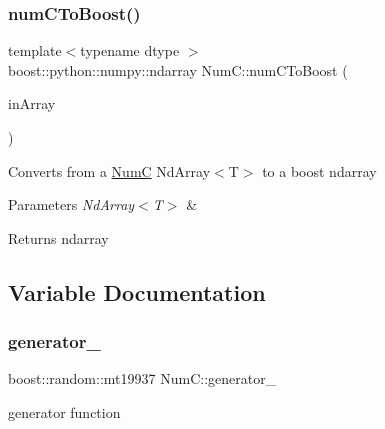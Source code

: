 \subsubsection{\texorpdfstring{num\+C\+To\+Boost()}{numCToBoost()}}
{\footnotesize\ttfamily template$<$typename dtype $>$ \\
boost\+::python\+::numpy\+::ndarray Num\+C\+::num\+C\+To\+Boost (\begin{DoxyParamCaption}\item[{const \mbox{\hyperlink{class_num_c_1_1_nd_array}{Nd\+Array}}$<$ dtype $>$ \&}]{in\+Array }\end{DoxyParamCaption})}

Converts from a \mbox{\hyperlink{namespace_num_c}{NumC}} Nd\+Array$<$\+T$>$ to a boost ndarray


\begin{DoxyParams}{Parameters}
{\em Nd\+Array$<$\+T$>$} & \\
\hline
\end{DoxyParams}
\begin{DoxyReturn}{Returns}
ndarray 
\end{DoxyReturn}


\subsection{Variable Documentation}
\mbox{\label{namespace_num_c_af78b9b391c2e4523f13bb00706b21b02}} 
\subsubsection{\texorpdfstring{generator\+\_\+}{generator\_}}
{\footnotesize\ttfamily boost\+::random\+::mt19937 Num\+C\+::generator\+\_\+}



generator function 

